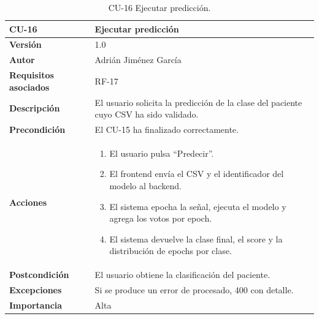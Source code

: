 \begin{table}[p]
	\centering
	\begin{tabularx}{\linewidth}{ p{} X }
		\toprule
		\textbf{CU-16}    & \textbf{Ejecutar predicción}\\
		\toprule
		\textbf{Versión}              & 1.0 \\
		\textbf{Autor}                & Adrián Jiménez García \\
		\textbf{Requisitos asociados} & RF-17 \\
		\textbf{Descripción}          & El usuario solicita la predicción de la clase del paciente cuyo CSV ha sido validado. \\
		\textbf{Precondición}         & El CU-15 ha finalizado correctamente. \\
		\textbf{Acciones}             &
		\begin{enumerate}
			\def\labelenumi{\arabic{enumi}.}
			\tightlist
			\item El usuario pulsa ``Predecir''.
			\item El frontend envía el CSV y el identificador del modelo al backend.
			\item El sistema epocha la señal, ejecuta el modelo y agrega los votos por epoch.
			\item El sistema devuelve la clase final, el score y la distribución de epochs por clase.
		\end{enumerate}\\
		\textbf{Postcondición}        & El usuario obtiene la clasificación del paciente. \\
		\textbf{Excepciones}          & Si se produce un error de procesado, 400 con detalle. \\
		\textbf{Importancia}          & Alta \\
		\bottomrule
	\end{tabularx}
	\caption{CU-16 Ejecutar predicción.}
\end{table}

